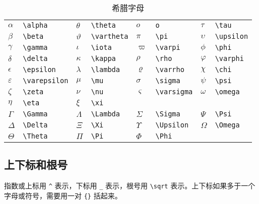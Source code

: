 \begin{table}[htbp]
\caption{希腊字母}
\label{tab:greek}
\centering
\begin{tabular}{llllllll}
  \toprule
  $\alpha$      & \verb|\alpha|      & $\theta$    & \verb|\theta|    & 
    $o$         & \verb|o|        & $\tau$     & \verb|\tau| \\
  $\beta$       & \verb|\beta|       & $\vartheta$ & \verb|\vartheta| & 
    $\pi$       & \verb|\pi|      & $\upsilon$ & \verb|\upsilon| \\
  $\gamma$      & \verb|\gamma|      & $\iota$     & \verb|\iota|     & 
    $\varpi$    & \verb|\varpi|   & $\phi$     & \verb|\phi| \\
  $\delta$      & \verb|\delta|      & $\kappa$    & \verb|\kappa|    & 
    $\rho$      & \verb|\rho|     & $\varphi$  & \verb|\varphi| \\
  $\epsilon$    & \verb|\epsilon|    & $\lambda$   & \verb|\lambda|   & 
    $\varrho$   & \verb|\varrho|  & $\chi$     & \verb|\chi| \\
  $\varepsilon$ & \verb|\varepsilon| & $\mu$       & \verb|\mu|       & 
    $\sigma$    & \verb|\sigma|   & $\psi$     & \verb|\psi| \\
  $\zeta$       & \verb|\zeta|       & $\nu$       & \verb|\nu|       & 
    $\varsigma$ & \verb|\varsigma|   & $\omega$   & \verb|\omega| \\
  $\eta$        & \verb|\eta|        & $\xi$       & \verb|\xi|       & 
    &                 &            & \\
  $\Gamma$      & \verb|\Gamma|      & $\Lambda$   & \verb|\Lambda|   & 
    $\Sigma$    & \verb|\Sigma|   & $\Psi$     & \verb|\Psi| \\
  $\Delta$      & \verb|\Delta|      & $\Xi$       & \verb|\Xi|       & 
    $\Upsilon$  & \verb|\Upsilon| & $\Omega$   & \verb|\Omega| \\
  $\Theta$      & \verb|\Theta|      & $\Pi$       & \verb|\Pi|       & 
    $\Phi$      & \verb|\Phi|     &            & \\
  \bottomrule
\end{tabular}
\end{table}

\subsection{上下标和根号}

指数或上标用 \verb|^| 表示，下标用 \verb|_| 表示，根号用 \verb|\sqrt| 表示。上下标如果多于一个字母或符号，需要用一对 \verb|{}| 括起来。

